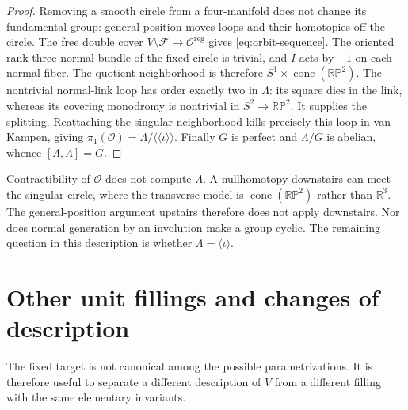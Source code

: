 \documentclass[11pt]{amsart}
\theoremstyle{definition}
\theoremstyle{remark}
\newcommand{\nc}[1]{\langle\!\langle #1\rangle\!\rangle}
\begin{document}
\begin{proof}
Removing a smooth circle from a four-manifold does not change its
fundamental group: general position moves loops and their homotopies
off the circle. The free double cover
$V\setminus\mathcal F\to\mathcal O^{\mathrm{reg}}$ gives
\eqref{eq:orbit-sequence}. The oriented rank-three normal bundle of
the fixed circle is trivial, and $I$ acts by $-1$ on each normal
fiber. The quotient neighborhood is therefore
$S^1\times\operatorname{cone}(\mathbb{RP}^2)$.
The nontrivial normal-link loop has order exactly two in $\Lambda$:
its square dies in the link, whereas its covering monodromy is
nontrivial in $S^2\to\mathbb{RP}^2$. It supplies the splitting.
Reattaching the singular neighborhood kills precisely this loop in
van Kampen, giving $\pi_1(\mathcal O)=\Lambda/\nc\iota$.
Finally $G$ is perfect and $\Lambda/G$ is abelian, whence
$[\Lambda,\Lambda]=G$.
\end{proof}

Contractibility of $\mathcal O$ does not compute $\Lambda$.
A nullhomotopy downstairs can meet the singular circle, where the
transverse model is $\operatorname{cone}(\mathbb{RP}^2)$ rather
than $\mathbb R^3$. The general-position argument upstairs therefore
does not apply downstairs. Nor does normal generation by an involution
make a group cyclic. The remaining question in this description is
whether $\Lambda=\langle\iota\rangle$.

\section{Other unit fillings and changes of description}\label{sec:variants}
The fixed target is not canonical among the possible parametrizations.
It is therefore useful to separate a different description of $V$
from a different filling with the same elementary invariants.
\end{document}
